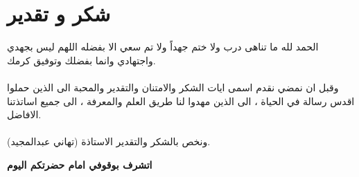 \chapter*{شكر و تقدير}

الحمد لله ما تناهى درب ولا ختم جهداً ولا تم سعي الا بفضله اللهم ليس بجهدي واجتهادي وانما بفضلك وتوفيق كرمك.\\ \\
\noindent
وقبل ان نمضي نقدم اسمى ايات الشكر والامتنان والتقدير والمحبة الى الذين حملوا اقدس رسالة في الحياة ، الى الذين مهدوا لنا طريق العلم والمعرفة ، الى جميع اساتذتنا الافاضل. \\ \\
\noindent
ونخص بالشكر والتقدير الاستاذة (تهاني عبدالمجيد).\\
\begin{center}
	\textbf{اتشرف بوقوفي امام حضرتكم اليوم}
\end{center}
